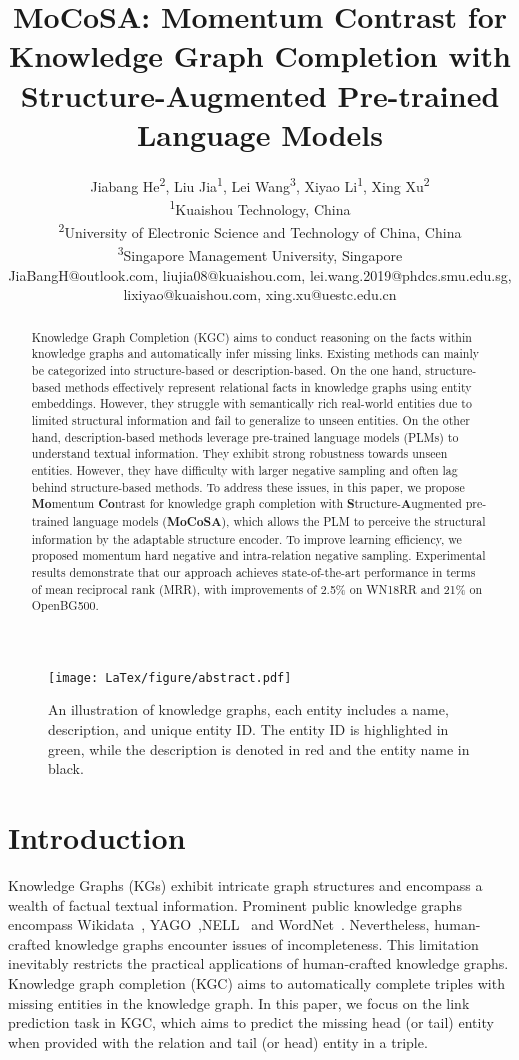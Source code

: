 \documentclass[11pt]{article}
\title{MoCoSA: Momentum Contrast for Knowledge Graph Completion with Structure-Augmented Pre-trained Language Models}
\author{Jiabang He\textsuperscript{\rm 2}\Thanks{This is work done during an internship at Kwai}, Liu	Jia\textsuperscript{\rm 1}, Lei	Wang\textsuperscript{\rm 3}, Xiyao Li\textsuperscript{\rm 1}, Xing Xu\textsuperscript{\rm 2} \\
       \textsuperscript{\rm 1}Kuaishou Technology, China\\ \textsuperscript{\rm 2}University of Electronic Science and Technology of China, China \\ \textsuperscript{\rm 3}Singapore Management University, Singapore \\
       JiaBangH@outlook.com, liujia08@kuaishou.com,
       lei.wang.2019@phdcs.smu.edu.sg, \\
       lixiyao@kuaishou.com,
       xing.xu@uestc.edu.cn
       }
\begin{document}
\maketitle

\begin{abstract}
Knowledge Graph Completion (KGC) aims to conduct reasoning on the facts within knowledge graphs and automatically infer missing links. Existing methods can mainly be categorized into structure-based or description-based.
On the one hand, structure-based methods effectively represent relational facts in knowledge graphs using entity embeddings. 
However, they struggle with semantically rich real-world entities due to limited structural information and fail to generalize to unseen entities. On the other hand, description-based methods leverage pre-trained language models (PLMs) to understand textual information. They exhibit strong robustness towards unseen entities. However, they have difficulty with larger negative sampling and often lag behind structure-based methods. 
To address these issues, in this paper, we propose 
\textbf{Mo}mentum \textbf{Co}ntrast for knowledge graph completion with \textbf{S}tructure-\textbf{A}ugmented pre-trained language models (\textbf{MoCoSA}), which allows the PLM to perceive the structural information by the adaptable structure encoder. To improve learning efficiency, we proposed momentum hard negative and intra-relation negative sampling.
Experimental results demonstrate that our approach achieves state-of-the-art performance in terms of mean reciprocal rank (MRR), with improvements of 2.5\% on WN18RR and 21\% on OpenBG500.

\end{abstract}

\begin{figure}[!htb]
  \centering
\texttt{[image: LaTex/figure/abstract.pdf]}
\caption{An illustration of knowledge graphs, each entity includes a name, description, and unique entity ID. The entity ID is highlighted in green, while the description is denoted in red and the entity name in black. }
  \label{fig:abstract}
\vspace{-5pt}
\end{figure}

\section{Introduction}

Knowledge Graphs (KGs) exhibit intricate graph structures and encompass a wealth of factual textual information. Prominent public knowledge graphs encompass Wikidata~\cite{Vrandei2014WikidataAF}, YAGO~\cite{Suchanek2007YagoAC},NELL~\cite{Carlson2010TowardAA} and WordNet~\cite{Fellbaum2000WordNetA}. Nevertheless, human-crafted knowledge graphs encounter issues of incompleteness. This limitation inevitably restricts the practical applications of human-crafted knowledge graphs. Knowledge graph completion (KGC) aims to automatically complete triples with missing entities in the knowledge graph. In this paper, we focus on the link prediction task in KGC, which aims to predict the missing head (or tail) entity when provided with the relation and tail (or head) entity in a triple.
\end{document}
